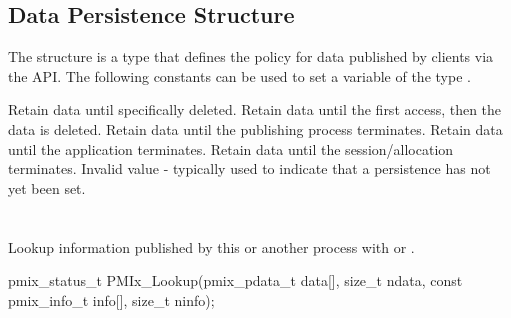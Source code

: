 \subsection{Data Persistence Structure}

The  structure is a  type that defines the policy for data published by clients via the  \ac{API}.
The following constants can be used to set a variable of the type .

\begin{constantdesc}
%
Retain data until specifically deleted.
%
Retain data until the first access, then the data is deleted.
%
Retain data until the publishing process terminates.
%
Retain data until the application terminates.
%
Retain data until the session/allocation terminates.
%
Invalid value - typically used to indicate that a persistence has not yet been set.
%
\end{constantdesc}


\section{}

\summary

Lookup information published by this or another process with  or .

\format

\cspecificstart
\begin{codepar}
pmix_status_t
PMIx_Lookup(pmix_pdata_t data[], size_t ndata,
            const pmix_info_t info[], size_t ninfo);
\end{codepar}
\cspecificend

\begin{arglist}
\end{arglist}

